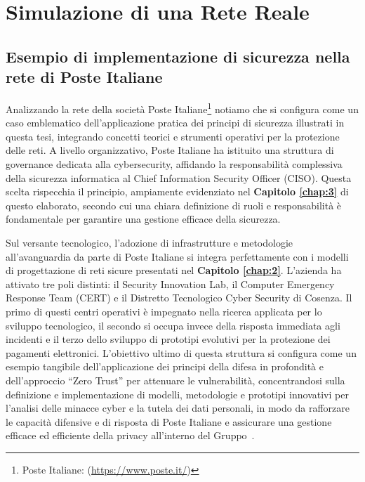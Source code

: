 \hypersetup{linkcolor=blue, citecolor=red}

\chapter{Simulazione di una Rete Reale} \label{chap:4}

    \section{Esempio di implementazione di sicurezza nella rete di Poste Italiane}

        Analizzando la rete della società Poste Italiane\footnote{Poste Italiane: (\url{https://www.poste.it/})} notiamo che si configura come un caso emblematico dell'applicazione pratica dei principi di sicurezza illustrati in questa tesi, integrando concetti teorici e strumenti operativi per la protezione delle reti.
        A livello organizzativo, Poste Italiane ha istituito una struttura di governance dedicata alla cybersecurity, affidando la responsabilità complessiva della sicurezza informatica al Chief Information Security Officer (CISO). Questa scelta rispecchia il principio, ampiamente evidenziato nel \textbf{Capitolo \ref{chap:3}} di questo elaborato, secondo cui una chiara definizione di ruoli e responsabilità è fondamentale per garantire una gestione efficace della sicurezza.

        Sul versante tecnologico, l'adozione di infrastrutture e metodologie all'avanguardia da parte di Poste Italiane si integra perfettamente con i modelli di progettazione di reti sicure presentati nel \textbf{Capitolo \ref{chap:2}}. L'azienda ha attivato tre poli distinti: il Security Innovation Lab, il Computer Emergency Response Team (CERT) e il Distretto Tecnologico Cyber Security di Cosenza. Il primo di questi centri operativi è impegnato nella ricerca applicata per lo sviluppo tecnologico, il secondo si occupa invece della risposta immediata agli incidenti e il terzo dello sviluppo di prototipi evolutivi per la protezione dei pagamenti elettronici. L'obiettivo ultimo di questa struttura si configura come un esempio tangibile dell'applicazione dei principi della difesa in profondità e dell'approccio “Zero Trust” per attenuare le vulnerabilità, concentrandosi sulla definizione e implementazione di modelli, metodologie e prototipi innovativi per l'analisi delle minacce cyber e la tutela dei dati personali, in modo da rafforzare le capacità difensive e di risposta di Poste Italiane e assicurare una gestione efficace ed efficiente della privacy all'interno del Gruppo~\cite{poste_cybersec}.

